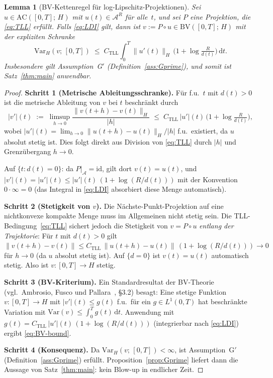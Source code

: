 \documentclass[12pt,a4paper]{article}
\theoremstyle{definition}
\theoremstyle{plain}
\newtheorem{lemma}[definition]{Lemma}
\theoremstyle{remark}
\begin{document}
\begin{lemma}[BV-Kettenregel für log-Lipschitz-Projektionen]
\label{lem:LL-BV}
Sei $u \in \mathrm{AC}([0,T];\,H)$ mit $u(t) \in \mathcal{A}^R$
für alle~$t$, und sei $P$ eine Projektion, die \eqref{eq:TLL} erfüllt.
Falls \eqref{eq:LDI} gilt, dann ist $v := P\circ u \in \mathrm{BV}([0,T];\,H)$
mit der expliziten Schranke
\begin{equation}\label{eq:BV-bound}
  \mathrm{Var}_H(v;\,[0,T])
  \;\le\;
  C_{\mathrm{TLL}}
  \int_0^T \|u'(t)\|_H\,
  \bigl(1 + \log\tfrac{R}{d(t)}\bigr)\,\mathrm{d}t.
\end{equation}
Insbesondere gilt Assumption~G$'$
\textup{(}Definition~\ref{ass:Gprime}\textup{)}, und somit ist
Satz~\ref{thm:main} anwendbar.
\end{lemma}

\begin{proof}
\textbf{Schritt 1 (Metrische Ableitungsschranke).}\;
Für f.u.\ $t$ mit $d(t)>0$ ist die metrische Ableitung von $v$ bei $t$
beschränkt durch
\[
  |v'|(t)
  \;:=\;
  \limsup_{h\to 0}\frac{\|v(t+h)-v(t)\|_H}{|h|}
  \;\le\;
  C_{\mathrm{TLL}}\,|u'|(t)\,
  \bigl(1 + \log\tfrac{R}{d(t)}\bigr),
\]
wobei $|u'|(t) = \lim_{h\to 0}\|u(t+h)-u(t)\|_H/|h|$ f.u.\ existiert,
da $u$ absolut stetig ist. Dies folgt direkt aus Division von \eqref{eq:TLL}
durch $|h|$ und Grenzübergang $h\to 0$.

Auf $\{t : d(t)=0\}$: da $P|_{\mathcal{A}} = \mathrm{id}$,
gilt dort $v(t) = u(t)$, und $|v'|(t) = |u'|(t) \le |u'|(t)\,
(1+\log(R/d(t)))$ mit der Konvention $0 \cdot \infty = 0$
(das Integral in \eqref{eq:LDI} absorbiert diese Menge automatisch).

\medskip
\noindent
\textbf{Schritt 2 (Stetigkeit von $v$).}\;
Die Nächste-Punkt-Projektion auf eine nichtkonvexe kompakte Menge muss
im Allgemeinen nicht stetig sein. Die TLL-Bedingung~\eqref{eq:TLL}
sichert jedoch die Stetigkeit von $v = P\circ u$ \emph{entlang der Trajektorie}:
Für $t$ mit $d(t) > 0$ gilt
$\|v(t+h)-v(t)\| \le C_{\mathrm{TLL}}\,\|u(t+h)-u(t)\|\,
(1+\log(R/d(t))) \to 0$ für $h \to 0$
(da $u$ absolut stetig ist). Auf $\{d=0\}$ ist $v(t)=u(t)$
automatisch stetig. Also ist $v: [0,T] \to H$ stetig.

\medskip
\noindent
\textbf{Schritt 3 (BV-Kriterium).}\;
Ein Standardresultat der BV-Theorie (vgl.\ Ambrosio, Fusco und
Pallara~\cite{AmbrosioFuscoPallara2000}, \S3.2) besagt: Eine stetige
Funktion $v: [0,T] \to H$ mit
$|v'|(t) \le g(t)$ f.u.\ für ein $g \in L^1(0,T)$ hat beschränkte
Variation mit $\mathrm{Var}(v) \le \int_0^T g(t)\,\mathrm{d}t$.
Anwendung mit $g(t) = C_{\mathrm{TLL}}\,|u'|(t)\,
(1+\log(R/d(t)))$ (integrierbar nach \eqref{eq:LDI}) ergibt
\eqref{eq:BV-bound}.

\medskip
\noindent
\textbf{Schritt 4 (Konsequenz).}\;
Da $\mathrm{Var}_H(v;\,[0,T]) < \infty$, ist Assumption~G$'$
(Definition~\ref{ass:Gprime}) erfüllt.
Proposition~\ref{prop:Gprime} liefert dann die Aussage von
Satz~\ref{thm:main}: kein Blow-up in endlicher Zeit.
\end{proof}
\end{document}
